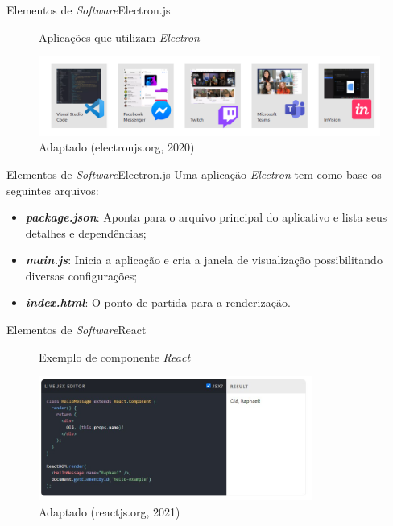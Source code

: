 \begin{frame}{Elementos de \textit{Software}}{Electron.js}

    \begin{figure}[H]
        \centering
        \caption{Aplicações que utilizam \textit{Electron}}
        \includegraphics[width=1.0\textwidth]{figuras/electron_apps.png}
        \caption*{\tiny{Adaptado (electronjs.org, 2020)}}
        \label{fig:electron_apps}
    \end{figure}

\end{frame}

\begin{frame}{Elementos de \textit{Software}}{Electron.js}
    Uma aplicação \textit{Electron} tem como base os seguintes arquivos:

\begin{itemize}
	\item \textbf{\textit{package.json}}: Aponta para o arquivo principal do aplicativo e lista seus detalhes e dependências;
	\item \textbf{\textit{main.js}}: Inicia a aplicação e cria a janela de visualização possibilitando diversas configurações; 
	\item \textbf{\textit{index.html}}: O ponto de partida para a renderização.
\end{itemize}

\end{frame}

\begin{frame}{Elementos de \textit{Software}}{React}

    \begin{figure}[H]
        \centering
        \caption{Exemplo de componente \textit{React}}
        \includegraphics[width=0.8\textwidth]{figuras/exemplo_react.jpg}
        \caption*{\tiny{Adaptado (reactjs.org, 2021)}}
        \label{fig:react_code}
    \end{figure}

\end{frame}